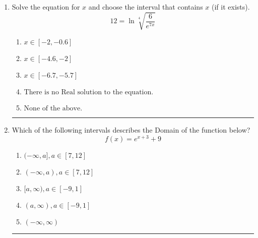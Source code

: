 \documentclass[14pt]{extbook}
\newcommand{\litem}[1]{\item#1\hspace*{-1cm}\rule{\textwidth}{0.4pt}}
\begin{document}
\begin{enumerate}
{\begin{enumerate}[label=\Alph*.]
\end{enumerate} }
\litem{
 Solve the equation for $x$ and choose the interval that contains $x$ (if it exists).\[  12 = \ln{\sqrt[4]{\frac{6}{e^{7x}}}} \]\begin{enumerate}[label=\Alph*.]
\item \( x \in [-2, -0.6] \)
\item \( x \in [-4.6, -2] \)
\item \( x \in [-6.7, -5.7] \)
\item \( \text{There is no Real solution to the equation.} \)
\item \( \text{None of the above.} \)

\end{enumerate} }
\litem{
Which of the following intervals describes the Domain of the function below?\[ f(x) = e^{x+3}+9 \]\begin{enumerate}[label=\Alph*.]
\item \( (-\infty, a], a \in [7, 12] \)
\item \( (-\infty, a), a \in [7, 12] \)
\item \( [a, \infty), a \in [-9, 1] \)
\item \( (a, \infty), a \in [-9, 1] \)
\item \( (-\infty, \infty) \)

\end{enumerate} }
\end{enumerate}
\end{document}

